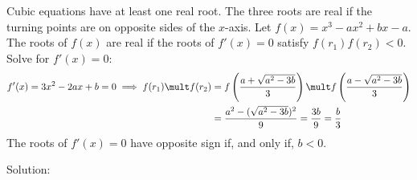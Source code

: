 Cubic equations have at least one real root. The three roots are real if the turning points are on opposite sides of the $x$-axis. Let $f(x)=x^{3}-ax^{2}+bx-a$. The roots of $f(x)$ are real if the roots of $f'(x)=0$ satisfy $f(r_{1})f(r_{2})<0$. Solve for $f'(x)=0$:
\begin{align*}
f'(x) = 3 x^{2} - 2ax + b = 0
\implies
f(r_{1}) \mult f(r_{2})
& = f\left(\frac{a + \sqrt{a^{2}-3b}}{3}\right) \mult f\left(\frac{a - \sqrt{a^{2}-3b}}{3}\right)
\\
& = \frac{a^{2}-(\sqrt{a^{2}-3b})^{2}}{9}
  = \frac{3b}{9}
  = \frac{b}{3}
\end{align*}
The roots of $f'(x)=0$ have opposite sign if, and only if, $b<0$.

Solution: 
